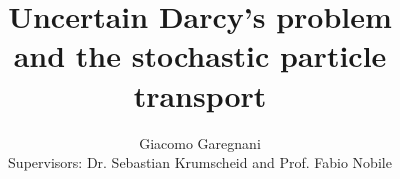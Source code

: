 \documentclass{article}
\title{Uncertain Darcy's problem \\ and the stochastic particle transport}
\author{Giacomo Garegnani \\ {Supervisors: Dr. Sebastian Krumscheid and Prof. Fabio Nobile}}
\date{}
\begin{document}
\clearpage
\thispagestyle{empty}

\maketitle
\tableofcontents

\clearpage
{}
\setcounter{page}{1}






\clearpage
\begin{appendices}

\end{appendices}

\clearpage


\end{document}
